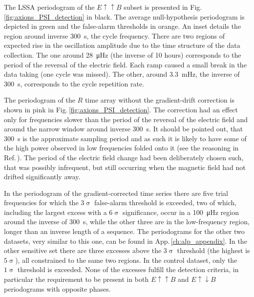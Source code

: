 The LSSA periodogram of the $E \uparrow \uparrow B$ subset is presented in Fig.\,\ref{fig:axions_PSI_detection} in black. The average null-hypothesis periodogram is depicted in green and the false-alarm thresholds in orange. An inset details the region around inverse \SI{300}{\second}, the cycle frequency.
There are two regions of expected rise in the oscillation amplitude due to the time structure of the data collection.
The one around \SI{28}{\micro\hertz} (the inverse of 10 hours) corresponds to the period of the reversal of the electric field. Each ramp caused a small break in the data taking (one cycle was missed).
The other, around \SI{3.3}{\milli\hertz}, the inverse of \SI{300}{\second}, corresponds to the cycle repetition rate.

The periodogram of the $R$ time array without the gradient-drift correction is shown in pink in Fig.\,\ref{fig:axions_PSI_detection}.
The correction had an effect only for frequencies slower than the period of the reversal of the electric field and around the narrow window around inverse \SI{300}{\second}.
It should be pointed out, that \SI{300}{\second} is the approximate sampling period and as such it is likely to have some of the high power observed in low frequencies folded onto it (see the reasoning in Ref.\,\cite{Shannon1949}).
The period of the electric field change had been deliberately chosen such, that was possibly infrequent, but still occurring when the magnetic field had not drifted significantly away.

In the periodogram of the gradient-corrected time series there are five
trial frequencies for which the $3\upsigma$ false-alarm threshold is exceeded,
two of which, including the largest excess with a $6\upsigma$ significance, occur in a \SI{100}{\micro\hertz} region around the inverse of \SI{300}{\second}, while the other three are in the low-frequency region, longer than an inverse length of a sequence.
 The periodograms for the other two datasets, very similar to this one, can be found in App.\,\ref{ch:alp_appendix}.
In the other sensitive set there are three excesses above the $3\upsigma$ threshold (the highest is $5\upsigma$), all constrained to the same two regions. In the control dataset, only the $1\upsigma$ threshold is exceeded. None of the excesses fulfill the detection criteria, in particular the requirement to be present in both $E \uparrow \uparrow B$ and $E \uparrow \downarrow B$ periodograms with opposite phases.

